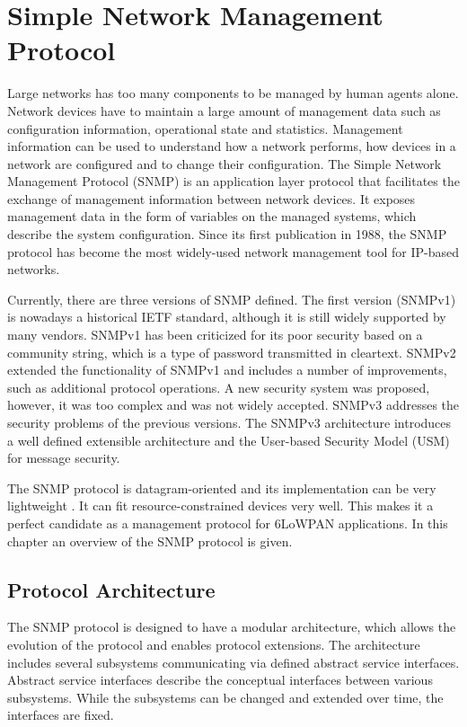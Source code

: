 \chapter{Simple Network Management Protocol}\label{ch:snmp}
Large networks has too many components to be managed by human agents alone. Network devices have to maintain a large amount of management data such as configuration information,  operational state and statistics. Management information can be used to understand how a network performs, how devices in a network are configured and to change their configuration. The Simple Network Management Protocol (SNMP) \cite{rfc3410} is an application layer protocol that facilitates the exchange of management information between network devices. It exposes management data in the form of variables on the managed systems, which describe the system configuration. Since its first publication in 1988, the SNMP protocol has become the most widely-used network management tool for IP-based networks.

Currently, there are three versions of SNMP defined. The first version (SNMPv1) is nowadays a historical IETF standard, although it is still widely supported by many vendors. SNMPv1 has been criticized for its poor security based on a community string, which is a type of password transmitted in cleartext. SNMPv2 extended the functionality of SNMPv1 and includes a number of improvements, such as additional protocol operations. A new security system was proposed, however, it was too complex and was not widely accepted. SNMPv3 addresses the security problems of the previous versions. The SNMPv3 architecture introduces a well defined extensible architecture and the User-based Security Model (USM) for message security.

The SNMP protocol is datagram-oriented and its implementation can be very lightweight \cite{draft-6lowpan-snmp}. It can fit resource-constrained devices very well. This makes it a perfect candidate as a management protocol for 6LoWPAN applications. In this chapter an overview of the SNMP protocol is given.

\section{Protocol Architecture}
The SNMP protocol is designed to have a modular architecture, which allows the evolution of the protocol and enables protocol extensions. The architecture includes several subsystems communicating via defined abstract service interfaces. Abstract service interfaces describe the conceptual interfaces between various subsystems.  While the subsystems can be changed and extended over time, the interfaces are fixed.

